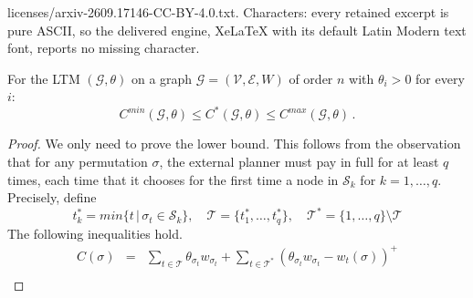 \documentclass[10pt,a4paper]{amsart}
\newcommand{\be}{\begin{equation}}
\newcommand{\ee}{\end{equation}}
\newcommand{\mc}{\mathcal}
\newcommand{\threabs}{\theta}
\newcommand{\thre}{\theta}
\begin{document}
licenses/arxiv-2609.17146-CC-BY-4.0.txt. Characters: every retained excerpt is pure ASCII, so the delivered engine, XeLaTeX with its default Latin Modern text font, reports no missing character.
\begin{corollary} 
\label{cor:conservation} For the LTM $(\mc G,\threabs)$ on a graph $\mc G=(\mc V, \mc E, W)$ of order $n$ with $\thre_i>0$ for every $i$: 
\be\label{basic-bound}C^{min}(\mc G,\threabs)\leq C^*(\mc G, \threabs)\leq C^{max}(\mc G,\threabs)\,.\ee
\end{corollary}

\begin{proof} 
We only need to prove the lower bound. This  follows from the observation that for any permutation $\sigma$, the external planner must pay in full for at least $q$ times, each time that it chooses for the first time a node in $\mc S_k$ for $k=1,\dots , q$. 
Precisely, define
$$t^*_k=min\{t\,|\, \sigma_t\in\mc S_k\},\quad \mc T=\{t^*_1,\dots , t^*_q\},\quad \mc T^*=\{1,\dots , q\}\setminus\mc T$$
The following inequalities hold.
$$\begin{array}{rcl}C(\sigma)&=&\sum\limits_{t\in\mc T}\threabs_{\sigma_{t}}w_{\sigma_{t}}+\sum\limits_{t\in\mc T^*}(\threabs_{\sigma_t}w_{\sigma_t}-w_t(\sigma))^+\\ 

\end{array}$$
\end{proof}
\end{document}
